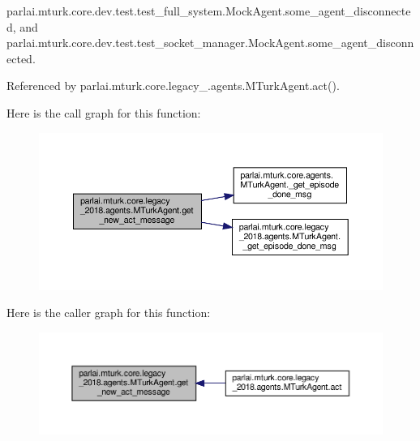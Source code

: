 parlai.\+mturk.\+core.\+dev.\+test.\+test\+\_\+full\+\_\+system.\+Mock\+Agent.\+some\+\_\+agent\+\_\+disconnected, and parlai.\+mturk.\+core.\+dev.\+test.\+test\+\_\+socket\+\_\+manager.\+Mock\+Agent.\+some\+\_\+agent\+\_\+disconnected.



Referenced by parlai.\+mturk.\+core.\+legacy\+\_.\+agents.\+M\+Turk\+Agent.\+act().

Here is the call graph for this function\+:
\nopagebreak
\begin{figure}[H]
\begin{center}
\leavevmode
\includegraphics[width=350pt]{classparlai_1_1mturk_1_1core_1_1legacy__2018_1_1agents_1_1MTurkAgent_a4a4600fbaef5ddae36ae3d74542b35fe_cgraph}
\end{center}
\end{figure}
Here is the caller graph for this function\+:
\nopagebreak
\begin{figure}[H]
\begin{center}
\leavevmode
\includegraphics[width=350pt]{classparlai_1_1mturk_1_1core_1_1legacy__2018_1_1agents_1_1MTurkAgent_a4a4600fbaef5ddae36ae3d74542b35fe_icgraph}
\end{center}
\end{figure}
\mbox{\label{classparlai_1_1mturk_1_1core_1_1legacy__2018_1_1agents_1_1MTurkAgent_abb7463e1f56718d7faf6829a71f7d05a}} 
